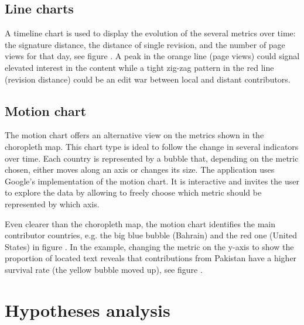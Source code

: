 \subsection{Line charts}

A timeline chart is used to display the evolution of the several metrics over time: the signature distance, the distance of single revision, and the number of page views for that day, see figure .
A peak in the orange line (page views) could signal elevated interest in the content while a tight zig-zag pattern in the red line (revision distance) could be an edit war between local and distant contributors.


\subsection{Motion chart}

The motion chart offers an alternative view on the metrics shown in the choropleth map.
This chart type is ideal to follow the change in several indicators over time.
Each country is represented by a bubble that, depending on the metric chosen, either moves along an axis or changes its size.
The application uses Google's implementation of the motion chart.
It is interactive and invites the user to explore the data by allowing to freely choose which metric should be represented by which axis.


Even clearer than the choropleth map, the motion chart identifies the main contributor countries, e.g. the big blue bubble (Bahrain) and the red one (United States) in figure .
In the example, changing the metric on the y-axis to show the proportion of located text reveals that contributions from Pakistan have a higher survival rate (the yellow bubble moved up), see figure . 



\section{Hypotheses analysis}\label{hypothesesanalysis}

